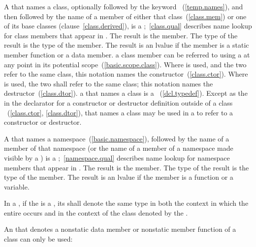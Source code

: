 A  that names a class, optionally
followed by the keyword ~(\ref{temp.names}), and then
followed by the name of a member of either that class~(\ref{class.mem})
or one of its base classes (clause~\ref{class.derived}), is a
%
;~\ref{class.qual} describes name lookup for
class members that appear in . The result is the
member. The type of the result is the type of the member. The result is
an lvalue if the member is a static member function or a data member.
\enternote 
a class member can be referred to using a  at any
point in its potential scope~(\ref{basic.scope.class}).
\exitnote 
Where  \tcode{::}  is used,
and the two  refer to the same class, this
notation names the constructor~(\ref{class.ctor}). Where
 \tcode{::\tilde}  is used,
the two  shall refer to the same class; this
notation names the destructor~(\ref{class.dtor}).
\enternote 
a  that names a class is a
~(\ref{dcl.typedef}). Except as the
 in the declarator for a constructor or destructor
definition outside of a class
~(\ref{class.ctor}, \ref{class.dtor}),
 that names a class may be used in a
 to refer to a constructor or destructor.
\exitnote 

\pnum
A  that names a
namespace~(\ref{basic.namespace}), followed by the name of a member of
that namespace (or the name of a member of a namespace made visible by a
) is a
%
;~\ref{namespace.qual} describes name lookup for
namespace members that appear in . The result is
the member. The type of the result is the type of the member. The result
is an lvalue if the member is a function or a variable.

\pnum
In a , if the  is a
, its 
shall denote the same type in both the context in which the entire
 occurs and in the context of the class denoted
by the .

\pnum
An  that denotes a nonstatic data member or
nonstatic member function of a class can only be used:

